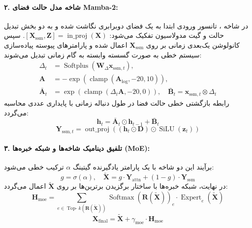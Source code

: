 \paragraph{۲. شاخه مدل حالت فضای Mamba-2:}
در شاخه ، تانسور ورودی ابتدا به یک فضای دوبرابری نگاشت شده و به دو بخش تبدیل حالت و گیت مدولاسیون تفکیک می‌شود: $[\mathbf{X}_{\text{ssm}}, \mathbf{Z}] = \operatorname{in\_proj}(\mathbf{X})$. سپس کانولوشن یک‌بعدی زمانی بر روی $\mathbf{X}_{\text{ssm}}$ اعمال شده و پارامترهای پیوسته پیاده‌سازی سیستم خطی به صورت گسسته وابسته به گام زمانی تبدیل می‌شوند:
\begin{align}
\Delta_t &= \operatorname{Softplus}\left(\mathbf{W}_{\Delta} \mathbf{x}_{\text{ssm}, t}\right), \\
\mathbf{A} &= -\exp\left(\operatorname{clamp}(\mathbf{A}_{\text{log}}, -20, 10)\right), \\
\bar{\mathbf{A}}_t &= \exp\left(\operatorname{clamp}(\Delta_t \mathbf{A}, -20, 0)\right), \quad \bar{\mathbf{B}}_t = \mathbf{x}_{\text{ssm}, t} \otimes \Delta_t
\end{align}
رابطه بازگشتی خطی حالت فضا در طول دنباله زمانی با پایداری عددی محاسبه می‌گردد:
\begin{equation}
\mathbf{h}_t = \bar{\mathbf{A}}_t \odot \mathbf{h}_{t-1} + \bar{\mathbf{B}}_t
\end{equation}
\begin{equation}
\mathbf{Y}_{\text{ssm}, t} = \operatorname{out\_proj}\left( \left(\mathbf{h}_t \odot \mathbf{D}\right) \odot \operatorname{SiLU}(\mathbf{z}_t) \right)
\end{equation}

\paragraph{۳. تلفیق دینامیک شاخه‌ها و شبکه خبره‌ها (MoE):}
برآیند این دو شاخه با یک پارامتر یادگیرنده گیتینگ $\alpha$ ترکیب خطی می‌شود:
\begin{equation}
g = \sigma(\alpha), \quad \tilde{\mathbf{X}} = g \cdot \mathbf{Y}_{\text{attn}} + (1 - g) \cdot \mathbf{Y}_{\text{ssm}}
\end{equation}
در نهایت، شبکه خبره‌ها با ساختار برگزیدن برترین‌ها  بر روی $\tilde{\mathbf{X}}$ اعمال می‌گردد:
\begin{equation}
\mathbf{H}_{\text{moe}} = \sum_{e \in \operatorname{Top-}k(\mathbf{R}(\tilde{\mathbf{X}}))} \operatorname{Softmax}(\mathbf{R}(\tilde{\mathbf{X}}))_e \cdot \operatorname{Expert}_e(\tilde{\mathbf{X}})
\end{equation}
\begin{equation}
\mathbf{X}_{\text{final}} = \tilde{\mathbf{X}} + \gamma_{\text{moe}} \cdot \mathbf{H}_{\text{moe}}
\end{equation}

